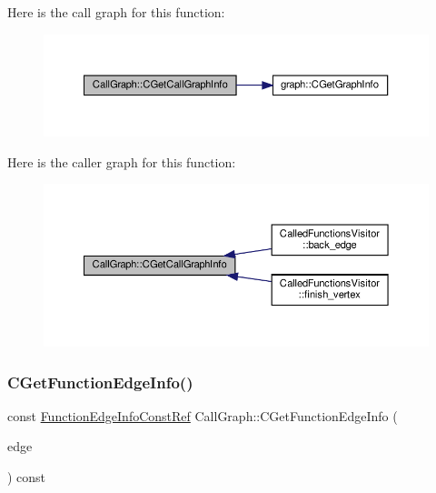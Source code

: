 Here is the call graph for this function\+:
\nopagebreak
\begin{figure}[H]
\begin{center}
\leavevmode
\includegraphics[width=350pt]{d0/d52/classCallGraph_a83bb9b87d1ff9829a11affd314b94e8f_cgraph}
\end{center}
\end{figure}
Here is the caller graph for this function\+:
\nopagebreak
\begin{figure}[H]
\begin{center}
\leavevmode
\includegraphics[width=350pt]{d0/d52/classCallGraph_a83bb9b87d1ff9829a11affd314b94e8f_icgraph}
\end{center}
\end{figure}
\mbox{\label{classCallGraph_a0c702a72c5f2e9472f1d36f079861fe3}} 
\subsubsection{\texorpdfstring{C\+Get\+Function\+Edge\+Info()}{CGetFunctionEdgeInfo()}}
{\footnotesize\ttfamily const \hyperlink{call__graph_8hpp_aace94cefc6132ce240df639f7a87d969}{Function\+Edge\+Info\+Const\+Ref} Call\+Graph\+::\+C\+Get\+Function\+Edge\+Info (\begin{DoxyParamCaption}\item[{const \hyperlink{graph_8hpp_a9eb9afea34e09f484b21f2efd263dd48}{Edge\+Descriptor}}]{edge }\end{DoxyParamCaption}) const\hspace{0.3cm}{\ttfamily [inline]}}



